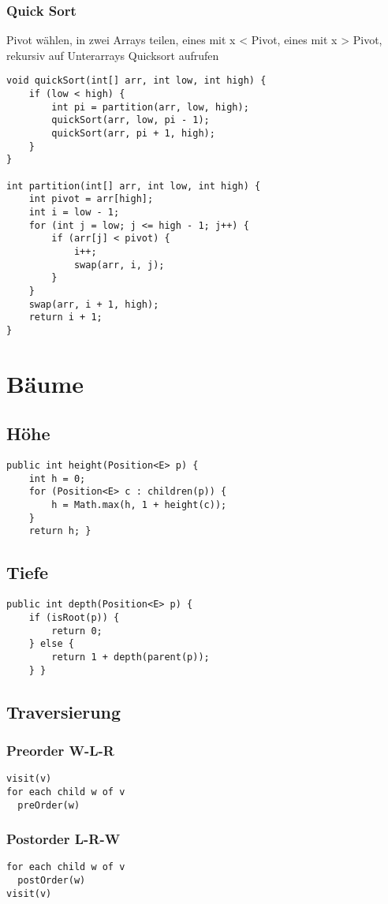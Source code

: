 \begin{multicols*}{5}
		\subsubsection{Quick Sort}
		Pivot wählen, in zwei Arrays teilen, eines mit x < Pivot, eines mit x > Pivot, rekursiv auf Unterarrays Quicksort aufrufen
			\begin{lstlisting}
void quickSort(int[] arr, int low, int high) {
	if (low < high) {
		int pi = partition(arr, low, high);
		quickSort(arr, low, pi - 1);
		quickSort(arr, pi + 1, high);
	}
}
	
int partition(int[] arr, int low, int high) {
	int pivot = arr[high];
	int i = low - 1;
	for (int j = low; j <= high - 1; j++) {
		if (arr[j] < pivot) {
			i++;
			swap(arr, i, j);
		}
	}
	swap(arr, i + 1, high);
	return i + 1;
}
			\end{lstlisting}
		
\section{Bäume}
	\subsection{Höhe}
		\begin{lstlisting}
public int height(Position<E> p) {
	int h = 0;
	for (Position<E> c : children(p)) {
		h = Math.max(h, 1 + height(c));
	}
	return h; }
		\end{lstlisting}
	
	\subsection{Tiefe}
		\begin{lstlisting}
public int depth(Position<E> p) {
	if (isRoot(p)) {
		return 0;
	} else {
		return 1 + depth(parent(p));
	} }
		\end{lstlisting}
	\subsection{Traversierung}
		\subsubsection{Preorder W-L-R}
			\begin{lstlisting}
visit(v)
for each child w of v
  preOrder(w)
			\end{lstlisting}
		
		\subsubsection{Postorder L-R-W}
			\begin{lstlisting}
for each child w of v
  postOrder(w)
visit(v)
			\end{lstlisting}
		

\end{multicols*}
